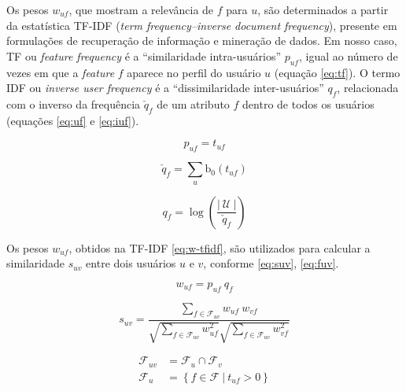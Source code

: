 Os pesos $w_{uf}$, que mostram a relevância de $f$ para $u$, são determinados a partir da estatística TF-IDF (\textit{term frequency--inverse document frequency}), presente em formulações de recuperação de informação e mineração de dados. Em nosso caso, TF ou \textit{feature frequency} é a ``similaridade intra-usuários'' $p_{uf}$, igual ao número de vezes em que a \textit{feature} $f$ aparece no perfil do usuário $u$ (equação \ref{eq:tf}). O termo IDF ou \textit{inverse user frequency} é a ``dissimilaridade inter-usuários'' $q_{f}$, relacionada com o inverso da frequência $\check{q}_{f}$ de um atributo $f$ dentro de todos os usuários (equações \ref{eq:uf} e \ref{eq:iuf}).

\begin{equation}
\label{eq:tf} 
    p_{uf} = t_{uf}
\end{equation} 


\begin{equation}
\label{eq:uf} 
    \check{q}_{f} = \sum_{u}{\mathrm{b}_0\left(t_{uf}\right)}
\end{equation} 

\begin{equation}
\label{eq:iuf} 
    q_{f} = \log \left( \frac{\left|~\mathcal{U}~\right|}{\check{q}_{f}} \right)
\end{equation} 

Os pesos $w_{uf}$, obtidos na TF-IDF \ref{eq:w-tfidf}, são utilizados para calcular a similaridade $s_{uv}$ entre dois usuários $u$ e $v$, conforme \ref{eq:suv}, \ref{eq:fuv}.

\begin{equation}
\label{eq:w-tfidf} 
    w_{uf} = p_{uf}~q_{f}
\end{equation} 


\begin{equation}
\label{eq:suv}
    s_{uv} = \frac{\sum\limits_{f \in \mathcal{F}_{uv}}{w_{uf}~w_{vf}}}{\sqrt{\sum\limits_{f \in \mathcal{F}_{uv}
    }w_{uf}^2} \sqrt{\sum\limits_{f \in \mathcal{F}_{uv}}w_{vf}^2}} 
\end{equation} 

\begin{equation}
\label{eq:fuv}
\begin{split}
    \mathcal{F}_{uv} &= \mathcal{F}_u \cap \mathcal{F}_v \\
    \mathcal{F}_u &= \left\{ f \in \mathcal{F}~|~t_{uf} > 0 \right\}
\end{split}    
\end{equation} 


